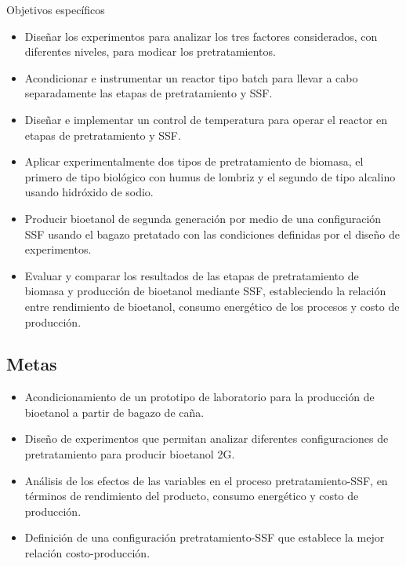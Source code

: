 \documentclass[12pt]{article}
\begin{document}
	{\large Objetivos específicos}
	
	\begin{itemize}
		\item Diseñar los experimentos para analizar los tres factores considerados, con diferentes niveles, para modicar los pretratamientos.
		\item Acondicionar e instrumentar un reactor tipo batch para llevar a cabo separadamente las etapas de pretratamiento y SSF.
		\item Diseñar e implementar un control de temperatura para operar el reactor en etapas de pretratamiento y SSF.
		\item Aplicar experimentalmente dos tipos de pretratamiento de biomasa, el primero de tipo biológico con humus de lombriz y el segundo de tipo alcalino usando hidróxido de sodio.
		\item Producir bioetanol de segunda generación por medio de una configuración SSF usando el bagazo pretatado con las condiciones definidas por el diseño de experimentos.
		\item Evaluar y comparar los resultados de las etapas de pretratamiento de biomasa y producción de bioetanol mediante SSF, estableciendo la relación entre rendimiento de bioetanol, consumo energético de los procesos y costo de producción.		


	\end{itemize}
	
	\subsection{Metas}
	
	\begin{itemize}



		\item 
		Acondicionamiento de un prototipo de laboratorio para la producción de bioetanol a partir de bagazo de caña.
		
		\item 
		Diseño de experimentos que permitan analizar diferentes configuraciones de pretratamiento para producir bioetanol 2G. 
		
		
		\item 
		Análisis de los efectos de las variables en el proceso pretratamiento-SSF, en términos de rendimiento del producto, consumo energético y costo de producción.
		
	   \item Definición de una configuración pretratamiento-SSF que establece la mejor relación costo-producción.
		
	\end{itemize}
	\newpage
	
\end{document}
